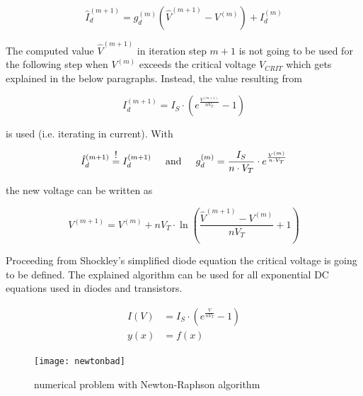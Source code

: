 \begin{equation}
\hat{I}_{d}^{(m+1)} = g_{d}^{(m)} \left(\hat{V}^{(m+1)} - V^{(m)}\right) + I_{d}^{(m)}
\end{equation}

The computed value $\hat{V}^{(m+1)}$ in iteration step $m+1$ is not
going to be used for the following step when $V^{(m)}$ exceeds the
critical voltage $V_{CRIT}$ which gets explained in the below
paragraphs.  Instead, the value resulting from

\begin{equation}
I_{d}^{(m+1)} = I_{S}\cdot \left(e^{\frac{V^{(m+1)}}{n V_{T}}} - 1\right)
\end{equation}

is used (i.e. iterating in current).  With

\begin{equation}
\hat{I}_{d}^{(m+1)} \; \shortstack{!\\=} \; I_{d}^{(m+1)}
\;\;\;\; \text{ and } \;\;\;\;
g_{d}^{(m)} = \dfrac{I_{S}}{n\cdot V_{T}}\cdot e^{\frac{V^{(m)}}{n\cdot V_{T}}}
\end{equation}

the new voltage can be written as

\begin{equation}
V^{(m+1)} = V^{(m)} + n V_{T}\cdot \ln{\left(\dfrac{\hat{V}^{(m+1)} - V^{(m)}}{n V_{T}} + 1\right)}
\end{equation}

Proceeding from Shockley's simplified diode equation the critical
voltage is going to be defined.  The explained algorithm can be used
for all exponential DC equations used in diodes and transistors.

\begin{align}
I\left(V\right) &= I_{S}\cdot \left(e^{\frac{V}{n V_{T}}} - 1\right)
\label{eq:curve}\\
y\left(x\right) &= f \left(x\right)
\label{eq:explicit}
\end{align}

\begin{figure}[ht]
\begin{center}
\texttt{[image: newtonbad]}
\end{center}
\caption{numerical problem with Newton-Raphson algorithm}
\label{fig:NewtonBad}
\end{figure}
\FloatBarrier

